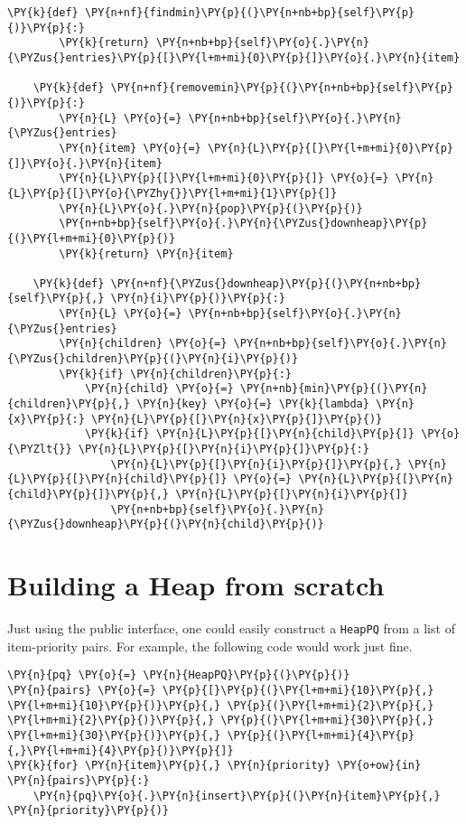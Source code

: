 \begin{Verbatim}[commandchars=\\\{\}]
    \PY{k}{def} \PY{n+nf}{findmin}\PY{p}{(}\PY{n+nb+bp}{self}\PY{p}{)}\PY{p}{:}
        \PY{k}{return} \PY{n+nb+bp}{self}\PY{o}{.}\PY{n}{\PYZus{}entries}\PY{p}{[}\PY{l+m+mi}{0}\PY{p}{]}\PY{o}{.}\PY{n}{item}

    \PY{k}{def} \PY{n+nf}{removemin}\PY{p}{(}\PY{n+nb+bp}{self}\PY{p}{)}\PY{p}{:}
        \PY{n}{L} \PY{o}{=} \PY{n+nb+bp}{self}\PY{o}{.}\PY{n}{\PYZus{}entries}
        \PY{n}{item} \PY{o}{=} \PY{n}{L}\PY{p}{[}\PY{l+m+mi}{0}\PY{p}{]}\PY{o}{.}\PY{n}{item}
        \PY{n}{L}\PY{p}{[}\PY{l+m+mi}{0}\PY{p}{]} \PY{o}{=} \PY{n}{L}\PY{p}{[}\PY{o}{\PYZhy{}}\PY{l+m+mi}{1}\PY{p}{]}
        \PY{n}{L}\PY{o}{.}\PY{n}{pop}\PY{p}{(}\PY{p}{)}
        \PY{n+nb+bp}{self}\PY{o}{.}\PY{n}{\PYZus{}downheap}\PY{p}{(}\PY{l+m+mi}{0}\PY{p}{)}
        \PY{k}{return} \PY{n}{item}

    \PY{k}{def} \PY{n+nf}{\PYZus{}downheap}\PY{p}{(}\PY{n+nb+bp}{self}\PY{p}{,} \PY{n}{i}\PY{p}{)}\PY{p}{:}
        \PY{n}{L} \PY{o}{=} \PY{n+nb+bp}{self}\PY{o}{.}\PY{n}{\PYZus{}entries}
        \PY{n}{children} \PY{o}{=} \PY{n+nb+bp}{self}\PY{o}{.}\PY{n}{\PYZus{}children}\PY{p}{(}\PY{n}{i}\PY{p}{)}
        \PY{k}{if} \PY{n}{children}\PY{p}{:}
            \PY{n}{child} \PY{o}{=} \PY{n+nb}{min}\PY{p}{(}\PY{n}{children}\PY{p}{,} \PY{n}{key} \PY{o}{=} \PY{k}{lambda} \PY{n}{x}\PY{p}{:} \PY{n}{L}\PY{p}{[}\PY{n}{x}\PY{p}{]}\PY{p}{)}
            \PY{k}{if} \PY{n}{L}\PY{p}{[}\PY{n}{child}\PY{p}{]} \PY{o}{\PYZlt{}} \PY{n}{L}\PY{p}{[}\PY{n}{i}\PY{p}{]}\PY{p}{:}
                \PY{n}{L}\PY{p}{[}\PY{n}{i}\PY{p}{]}\PY{p}{,} \PY{n}{L}\PY{p}{[}\PY{n}{child}\PY{p}{]} \PY{o}{=} \PY{n}{L}\PY{p}{[}\PY{n}{child}\PY{p}{]}\PY{p}{,} \PY{n}{L}\PY{p}{[}\PY{n}{i}\PY{p}{]}
                \PY{n+nb+bp}{self}\PY{o}{.}\PY{n}{\PYZus{}downheap}\PY{p}{(}\PY{n}{child}\PY{p}{)}
\end{Verbatim}


\section{Building a Heap from scratch}


Just using the public interface, one could easily construct a \texttt{HeapPQ} from a list of item-priority pairs.  For example, the following code would work just fine.

\begin{Verbatim}[commandchars=\\\{\}]
\PY{n}{pq} \PY{o}{=} \PY{n}{HeapPQ}\PY{p}{(}\PY{p}{)}
\PY{n}{pairs} \PY{o}{=} \PY{p}{[}\PY{p}{(}\PY{l+m+mi}{10}\PY{p}{,} \PY{l+m+mi}{10}\PY{p}{)}\PY{p}{,} \PY{p}{(}\PY{l+m+mi}{2}\PY{p}{,} \PY{l+m+mi}{2}\PY{p}{)}\PY{p}{,} \PY{p}{(}\PY{l+m+mi}{30}\PY{p}{,} \PY{l+m+mi}{30}\PY{p}{)}\PY{p}{,} \PY{p}{(}\PY{l+m+mi}{4}\PY{p}{,}\PY{l+m+mi}{4}\PY{p}{)}\PY{p}{]}
\PY{k}{for} \PY{n}{item}\PY{p}{,} \PY{n}{priority} \PY{o+ow}{in} \PY{n}{pairs}\PY{p}{:}
    \PY{n}{pq}\PY{o}{.}\PY{n}{insert}\PY{p}{(}\PY{n}{item}\PY{p}{,} \PY{n}{priority}\PY{p}{)}
\end{Verbatim}



